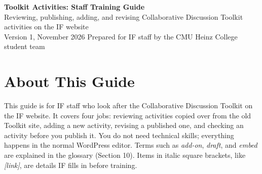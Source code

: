 
\usepackage{amssymb}
\newcommand{\chk}{$\square$\ }
\newcommand{\menu}[1]{\textbf{#1}}
\newcommand{\tbd}[1]{\textit{[#1]}}
\sloppy


\begin{center}
{\LARGE\bfseries Toolkit Activities: Staff Training Guide}\\[3pt]
{\large Reviewing, publishing, adding, and revising Collaborative Discussion Toolkit activities on the IF website}\\[2pt]
{\small Version 1, November 2026 \textbullet{} Prepared for IF staff by the CMU Heinz College student team}
\end{center}

\section{About This Guide}
This guide is for IF staff who look after the Collaborative Discussion Toolkit on the IF website. It covers four jobs: reviewing activities copied over from the old Toolkit site, adding a new activity, revising a published one, and checking an activity before you publish it. You do not need technical skills; everything happens in the normal WordPress editor. Terms such as \textit{add-on}, \textit{draft}, and \textit{embed} are explained in the glossary (Section 10). Items in italic square brackets, like \tbd{link}, are details IF fills in before training.

